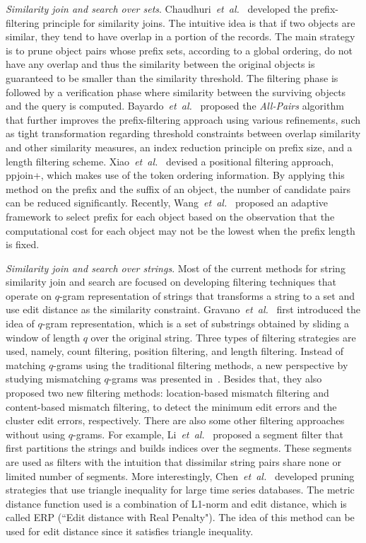 \emph{Similarity join and search over sets}. Chaudhuri~\textit{et~al.}~\cite{CGK06} developed the prefix-filtering principle for similarity joins. The intuitive idea is that if two objects are similar, they tend to have overlap in a portion of the records. The main strategy is to prune object pairs whose prefix sets, according to a global ordering, do not have any overlap and thus the similarity between the original objects is guaranteed to be smaller than the similarity threshold. The filtering phase is followed by a verification phase where similarity between the surviving objects and the query is computed.  Bayardo~\textit{et~al.}~\cite{BMS07} proposed the \emph{All-Pairs} algorithm that further improves the prefix-filtering approach using various refinements, such as tight transformation regarding threshold constraints between overlap similarity and other similarity measures, an index reduction principle on prefix size, and a length filtering scheme.  Xiao~\textit{et~al.}~\cite{XWLY08} devised a positional filtering approach, ppjoin+, which makes use of the token ordering information. By applying this method on the prefix and the suffix of an object, the number of candidate pairs can be reduced significantly.  Recently, Wang~\textit{et~al.}~\cite{WangLF12} proposed an adaptive framework to select prefix for each object based on the observation that the computational cost for each object may not be the lowest when the prefix length is fixed.  

\emph{Similarity join and search over strings}. Most of the current methods for string similarity join and search are focused on developing filtering techniques that operate on $q$-gram representation of strings that transforms a string to a set and use edit distance as the similarity constraint. Gravano~\textit{et~al.}~\cite{GIJKMS01} first introduced the idea of $q$-gram representation, which is a set of substrings obtained by sliding a window of length $q$ over the original string. Three types of filtering strategies are used, namely, count filtering, position filtering, and length filtering. Instead of matching $q$-grams using the traditional filtering methods, a new perspective by studying mismatching $q$-grams was presented in~\cite{XWL08}. Besides that, they also proposed two new filtering methods: location-based mismatch filtering and content-based mismatch filtering, to detect the minimum edit errors and the cluster edit errors, respectively. There are also some other filtering approaches without using $q$-grams. For example, Li~\textit{et~al.}~\cite{LiDF13} proposed a segment filter that first partitions the strings and builds indices over the segments. These segments are used as filters with the intuition that dissimilar string pairs share none or limited number of segments. More interestingly, Chen~\textit{et~al.}~\cite{ChenN04} developed pruning strategies that use triangle inequality for large time series databases. The metric distance function used is a combination of L1-norm and edit distance, which is called ERP (``Edit distance with Real Penalty"). The idea of this method can be used for edit distance since it satisfies triangle inequality. 

